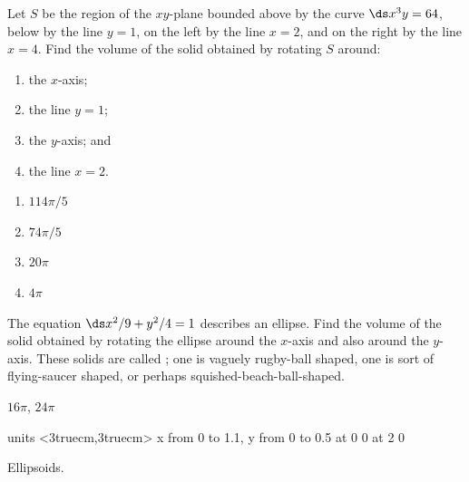 \begin{enumialphparenastyle}
\begin{ex}
Let $S$ be the region of the $xy$-plane bounded above by the curve
$\ds x^3y=64$, below by the line $y=1$, on the left by  the line $x=2$, and
on the right by the line $x=4$.  Find
the volume of the solid obtained by rotating $S$ around:
\begin{multicols}{2}
\begin{enumerate}
	\item	the $x$-axis;
	\item	the line $y=1$;
	\item	the $y$-axis; and
	\item	the line $x=2$.
\end{enumerate}
\end{multicols}
\begin{sol}
\begin{multicols}{2}
\begin{enumerate}
	\item	$114\pi/5$
	\item	$74\pi/5$
	\item	$20\pi$
	\item	$4\pi$
\end{enumerate}
\end{multicols}
\end{sol}
\end{ex}

\begin{ex}
 The equation $\ds x^2/9+y^2/4=1$ describes an ellipse.  Find the
volume of the solid obtained by rotating the ellipse around the
$x$-axis and also around the $y$-axis. These solids are
called ; one is vaguely rugby-ball shaped, one is
sort of flying-saucer shaped, or perhaps squished-beach-ball-shaped.
\begin{sol}
 $16\pi$, $24\pi$
\end{sol}
\end{ex}


\figure[H]
\centerline{\vbox{\beginpicture
\normalgraphs
\setcoordinatesystem units <3truecm,3truecm>
\setplotarea x from 0 to 1.1, y from 0 to 0.5
 at 0 0
 at 2 0
\endpicture}}
\caption{Ellipsoids.\label{fig:ellipsoids}}
\endfigure



\end{enumialphparenastyle}
